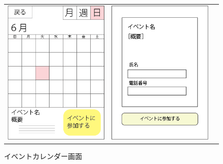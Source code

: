\begin{figure}[h]
    \begin{tabular}{ccc}
      \begin{minipage}[t]{0.33\hsize}
        \centering
        \includegraphics[keepaspectratio, scale=0.4]{process_figures/calender.png}
        \caption{イベントカレンダー画面}
        \label{calender}
      \end{minipage} &
      \begin{minipage}[t]{0.33\hsize}
        \centering
        \includegraphics[keepaspectratio, scale=0.4]{process_figures/joinform.png}

\end{minipage}
\end{tabular}
\end{figure}
